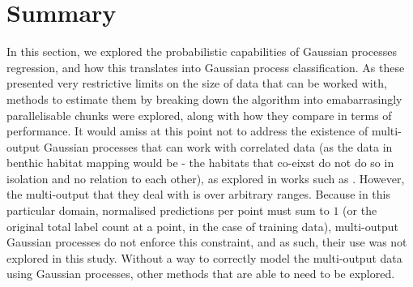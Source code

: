\citep{deisenroth15}


\section{Summary}

In this section, we explored the probabilistic capabilities of Gaussian processes regression, and how this translates into Gaussian process classification. As these presented very restrictive limits on the size of data that can be worked with, methods to estimate them by breaking down the algorithm into emabarrasingly parallelisable chunks were explored, along with how they compare in terms of performance. It would amiss at this point not to address the existence of multi-output Gaussian processes that can work with correlated data (as the data in benthic habitat mapping would be - the habitats that co-eixst do not do so in isolation and no relation to each other), as explored in works such as . However, the multi-output that they deal with is over arbitrary ranges. Because in this particular domain, normalised predictions per point must sum to $1$ (or the original total label count at a point, in the case of training data), multi-output Gaussian processes do not enforce this constraint, and as such, their use was not explored in this study. Without a way to correctly model the multi-output data using Gaussian processes, other methods that are able to need to be explored.
